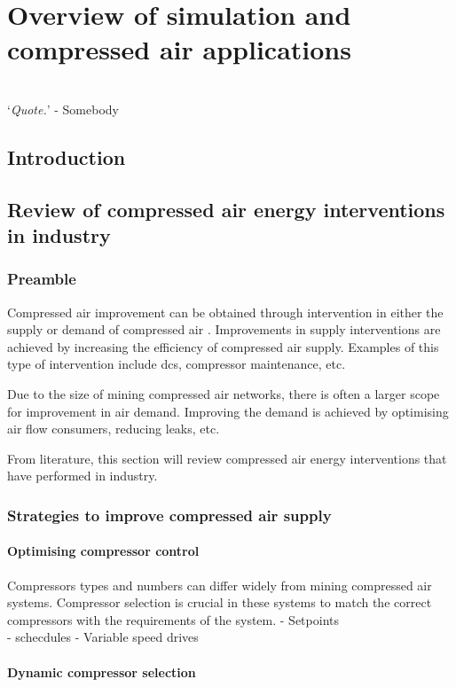 \chapter{Overview of simulation and compressed air applications}
\thispagestyle{empty}
\vspace{38em}
\hrulefill
\\
\enquote*{\textit{Quote.}} - Somebody\\
\clearpage
\section{Introduction}
\section{Review of compressed air energy interventions in industry}
	\subsection{Preamble}
		Compressed air improvement can be obtained through intervention in either the supply or demand of compressed air \cite{Kriel2014Masters}. Improvements in supply interventions are achieved by increasing the efficiency of compressed air supply. Examples of this type of intervention include \gls{dcs}, compressor maintenance, etc. 
		\par
		Due to the size of mining compressed air networks, there is often a larger scope for improvement in air demand. Improving the  demand is achieved by optimising air flow consumers, reducing leaks, etc.
		\par
	 	From literature, this section will review compressed air energy interventions that have performed in industry.
	\subsection{Strategies to improve compressed air supply}
		\subsubsection{Optimising compressor control}
		Compressors types and numbers can differ widely from mining compressed air systems. Compressor selection is crucial in these systems to match the correct compressors with the requirements of the system. \cite{marais2010expert}
		- Setpoints\\
		- schecdules
		- Variable speed drives\\
		\subsubsection{Dynamic compressor selection}
